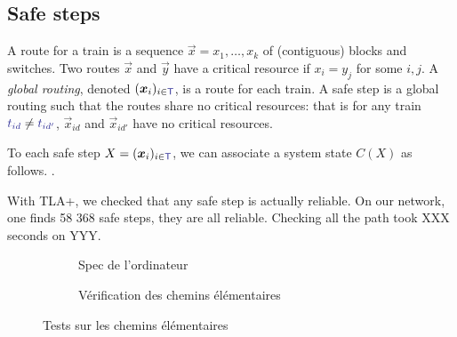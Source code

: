 \documentclass[runningheads]{llncs}
\newcommand{\trainFmt}[1]{{\color{traincolor} #1}}
\newcommand{\trains}{{\trainFmt{\mathsf{T}}}}
\newcommand{\tid}[1]{\ensuremath{\trainFmt{t_{#1}}}}
\begin{document}
\subsection{Safe steps}
\label{sec:experiments:4}

A route for a train is a sequence $\vec{x} = x_1, \ldots, x_k$ of (contiguous) blocks and switches. Two routes $\vec{x}$ and $\vec{y}$ have a critical resource if  $x_i = y_j$ for some $i,j$. A \emph{global routing}, denoted $(\vec{x}_i)_{i \in \trains}$,  is a route for each train. A safe step is a global routing such that the routes share no critical resources: that is for any train $\tid{id} \neq \tid{id'}$, $\vec{x}_{id}$ and $\vec{x}_{id'}$ have no critical resources. 

To each safe step $X = (\vec{x}_i)_{i \in \trains}$, we can associate a system state $C(X)$ as follows. . 

With TLA+, we checked that any safe step is actually reliable.  On our network, one finds 58 368 safe steps, they are all reliable. Checking all the path took XXX seconds on YYY. 



\begin{figure}
	\begin{subfigure}{0.5\textwidth}
		\centering
		\caption{Spec de l'ordinateur}
	\end{subfigure}
	\begin{subfigure}{0.5\textwidth}
		\centering
		\caption{Vérification des chemins élémentaires}
	\end{subfigure}
	\caption{Tests sur les chemins élémentaires}
\end{figure}
\label{fig:elem-tests}
\end{document}
